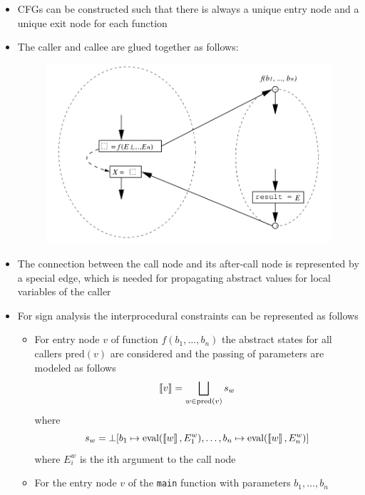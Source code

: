 \begin{itemize}
\begin{figure}[H]
    \end{figure}
  \item CFGs can be constructed such that there is always a unique entry node and a unique exit node for each function
  \item The caller and callee are glued together as follows:
  \begin{figure}[H]
    \centering
    \includegraphics[width=\linewidth]{img/interprocedural/interprocedural}
  \end{figure}
  \item The connection between the call node and its after-call node is represented by a special edge, which is needed for propagating abstract values for local variables of the caller
  \item For sign analysis the interprocedural constraints can be represented as follows
  \begin{itemize}
  	\item For entry node $v$ of function $f(b_1, \dots, b_n)$ the abstract states for all callers $\text{pred}(v)$ are considered and the passing of parameters are modeled as follows
    \begin{equation*}  
      \left\llbracket v\right\rrbracket = \bigsqcup_{w \in \text{pred}(v)} s_w
    \end{equation*}
    where
    \begin{equation*} 
      s_w = \bot[b_1 \mapsto \text{eval}(\left\llbracket w\right\rrbracket, E_1^w), \dots, b_n \mapsto \text{eval}(\left\llbracket w\right\rrbracket, E_n^w)]
    \end{equation*}
    where $E_i^w$ is the ith argument to the call node
    \item For the entry node $v$ of the \texttt{main} function with parameters $b_1, \dots, b_n$ 
    \begin{equation*}

\end{equation*}
\end{itemize}
\end{itemize}
